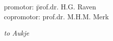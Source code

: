 \newpage
\thispagestyle{empty}

\begin{tabbing}
  promotor:    \hspace{30pt}\=  prof.dr. H.G. Raven  \\
  copromotor:               \>  prof.dr. M.H.M. Merk
\end{tabbing}

\newpage
\thispagestyle{empty}


\begin{center}
  \large
  \emph{to Aukje}
\end{center}


\newpage
\thispagestyle{empty}

\cleardoublepage
